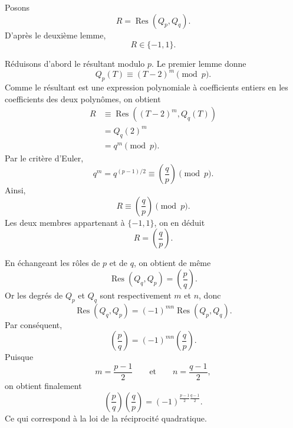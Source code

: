\documentclass[11pt,a4paper]{article}
\newcommand{\Res}{\operatorname{Res}}
\begin{document}
Posons
\[
R=\Res(Q_p,Q_q).
\]
D'après le deuxième lemme,
\[
R\in\{-1,1\}.
\]

Réduisons d'abord le résultant modulo \(p\). Le premier lemme donne
\[
Q_p(T)\equiv(T-2)^m\pmod p.
\]
Comme le résultant est une expression polynomiale à coefficients entiers
en les coefficients des deux polynômes, on obtient
\begin{align*}
R
&\equiv
\Res\left((T-2)^m,Q_q(T)\right) \\
&=
Q_q(2)^m \\
&=
q^m
\pmod p.
\end{align*}
Par le critère d'Euler,
\[
q^m
=
q^{(p-1)/2}
\equiv
\left(\frac{q}{p}\right)
\pmod p.
\]
Ainsi,
\[
R\equiv\left(\frac{q}{p}\right)\pmod p.
\]
Les deux membres appartenant à \(\{-1,1\}\), on en déduit
\[
R=\left(\frac{q}{p}\right).
\]

En échangeant les rôles de \(p\) et de \(q\), on obtient de même
\[
\Res(Q_q,Q_p)
=
\left(\frac{p}{q}\right).
\]
Or les degrés de \(Q_p\) et \(Q_q\) sont respectivement \(m\) et \(n\), donc
\[
\Res(Q_q,Q_p)
=
(-1)^{mn}\Res(Q_p,Q_q).
\]
Par conséquent,
\[
\left(\frac{p}{q}\right)
=
(-1)^{mn}\left(\frac{q}{p}\right).
\]
Puisque
\[
m=\frac{p-1}{2}
\qquad\text{et}\qquad
n=\frac{q-1}{2},
\]
on obtient finalement
\[
\boxed{
\left(\frac{p}{q}\right)
\left(\frac{q}{p}\right)
=
(-1)^{\frac{p-1}{2}\frac{q-1}{2}}
}.
\]
Ce qui correspond à la loi de la réciprocité quadratique.
\end{document}
